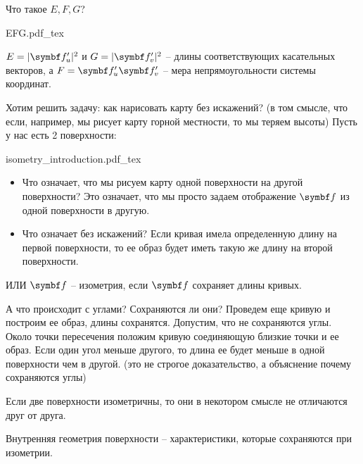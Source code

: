 \documentclass[main]{subfiles}
\begin{document}
Что такое $E, F, G$?
\begin{center}
    {EFG.pdf_tex}
\end{center}
$E = |\vf_u'|^2$ и $G = |\vf_v'|^2$ -- длины соответствующих касательных векторов, а
$F = \vf_u' \vf_v'$ -- мера непрямоугольности системы координат.

Хотим решить задачу: как нарисовать карту без искажений? 
(в том смысле, что если, например, мы рисует карту горной местности, то мы теряем высоты)
Пусть у нас есть 2 поверхности:
\begin{center}
    {isometry_introduction.pdf_tex}
\end{center}
\begin{itemize}
    \item Что означает, что мы рисуем карту одной поверхности на другой поверхности?
          Это означает, что мы просто задаем отображение $\vf$ из одной поверхности в другую.
    \item Что означает без искажений?
          Если кривая имела определенную длину на первой поверхности, то ее образ будет иметь такую же длину на второй поверхности.
\end{itemize}
ИЛИ $\vf$ -- изометрия, если $\vf$ сохраняет длины кривых.

А что происходит с углами? Сохраняются ли они?
Проведем еще кривую и построим ее образ, длины сохранятся.
Допустим, что не сохраняются углы.
Около точки пересечения положим кривую соединяющую близкие точки и ее образ.
Если один угол меньше другого, то длина ее будет меньше в одной поверхности чем в другой.
(это не строгое доказательство, а объяснение почему сохраняются углы)

Если две поверхности изометричны, то они в некотором смысле не отличаются друг от друга.

Внутренняя геометрия поверхности -- характеристики, которые сохраняются при изометрии.
\end{document}
